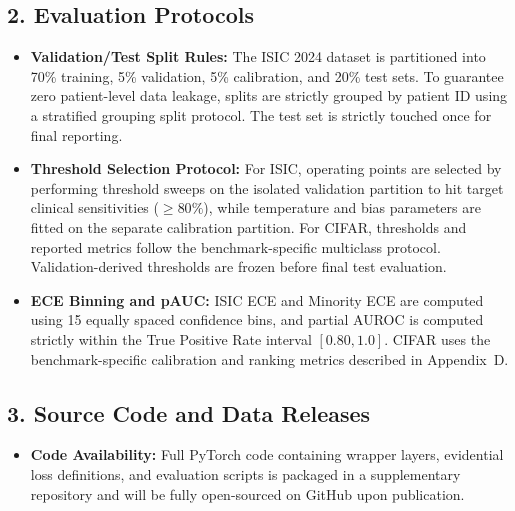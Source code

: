 \documentclass[letterpaper]{article} %
\begin{document}
\subsection*{2. Evaluation Protocols}
\begin{itemize}
    \item \textbf{Validation/Test Split Rules:} The ISIC 2024 dataset is partitioned into 70\% training, 5\% validation, 5\% calibration, and 20\% test sets. To guarantee zero patient-level data leakage, splits are strictly grouped by patient ID using a stratified grouping split protocol. The test set is strictly touched once for final reporting.
    \item \textbf{Threshold Selection Protocol:} For ISIC, operating points are selected by performing threshold sweeps on the isolated validation partition to hit target clinical sensitivities ($\ge 80\%$), while temperature and bias parameters are fitted on the separate calibration partition. For CIFAR, thresholds and reported metrics follow the benchmark-specific multiclass protocol. Validation-derived thresholds are frozen before final test evaluation.
    \item \textbf{ECE Binning and pAUC:} ISIC ECE and Minority ECE are computed using 15 equally spaced confidence bins, and partial AUROC is computed strictly within the True Positive Rate interval $[0.80, 1.0]$. CIFAR uses the benchmark-specific calibration and ranking metrics described in Appendix~D.
\end{itemize}

\subsection*{3. Source Code and Data Releases}
\begin{itemize}
    \item \textbf{Code Availability:} Full PyTorch code containing wrapper layers, evidential loss definitions, and evaluation scripts is packaged in a supplementary repository and will be fully open-sourced on GitHub upon publication.
\end{itemize}
\end{document}
